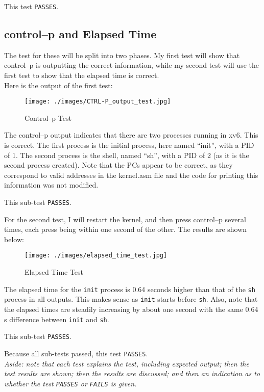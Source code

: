 \documentclass[11pt,letterpaper]{report}
\begin{document}
	This test {\tt PASSES}.
	
	\subsection*{control--p and Elapsed Time}
	The test for these will be split into two phases. My first test will show that control--p is outputting the correct information, while my second test will use the first test to show that the elapsed time is correct. \\
	
	\noindent Here is the output of the first test:

\begin{figure}[h]
\centering
\texttt{[image: ./images/CTRL-P\_output\_test.jpg]}
\caption[ctl-p test]{Control--p Test}
\label{fig:ctl-p_1}
\end{figure}	
	
	 The control--p output indicates that there are two processes running in xv6. This is correct. The first process is the initial process, here named ``init'', with a PID of 1. The second process is the shell, named ``sh'', with a PID of 2 (as it is the second process created). Note that the PCs appear to be correct, as they correspond to valid addresses in the kernel.asm file and the code for printing this information was not modified. 
	
	This sub-test {\tt PASSES}. 

\newpage
	For the second test, I will restart the kernel, and then press control--p several times, each press being within one second of the other. The results are shown below:

\begin{figure}[h!]
\centering
\texttt{[image: ./images/elapsed\_time\_test.jpg]}
\caption[elapsed time]{Elapsed Time Test}
\label{fig:elapsed}
\end{figure}	
	
	The elapsed time for the  {\tt init} process is 0.64 seconds higher than that of the {\tt sh} process in all outputs. This makes sense as {\tt init} starts before {\tt sh}. Also, note that the elapsed times are steadily increasing by about one second with the same 0.64 s difference between {\tt init} and {\tt sh}. 
	
	This sub-test {\tt PASSES}.
	
	Because all sub-tests passed, this test {\tt PASSES}. \\
	
	\noindent \emph{Aside: note that each test explains the test, including expected output; then the test results are shown; then the results are discussed; and then an indication as to whether the test {\tt PASSES} or {\tt FAILS} is given.}
\end{document}
